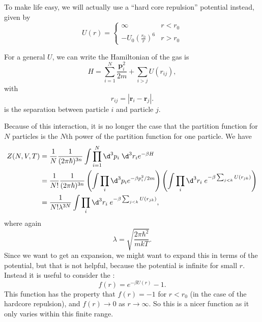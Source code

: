 \documentclass[a4paper]{article}
\begin{document}
\begin{eg}
\begin{center}
\begin{tikzpicture}
    \end{tikzpicture}
  \end{center}
  To make life easy, we will actually use a ``hard core repulsion'' potential instead, given by
  \[
    U(r) =
    \begin{cases}
      \infty & r < r_0\\
      -U_0 \left(\frac{r_0}{r}\right)^6 & r > r_0
    \end{cases}
  \]
  \begin{center}
  \end{center}
\end{eg}
For a general $U$, we can write the Hamiltonian of the gas is
\[
  H = \sum_{i = 1}^N \frac{\mathbf{p}_i^2}{2m} + \sum_{i > j} U(r_{ij}),
\]
with
\[
  r_{ij} = |\mathbf{r}_i - \mathbf{r}_j|.
\]
is the separation between particle $i$ and particle $j$.

Because of this interaction, it is no longer the case that the partition function for $N$ particles is the $N$th power of the partition function for one particle. We have
\begin{align*}
  Z(N, V, T) &= \frac{1}{N} \frac{1}{(2\pi \hbar)^{3n}} \int \prod_{i = 1}^N \d^3 p_i\; \d^3 r_i e^{-\beta H}\\
  &= \frac{1}{N!} \frac{1}{(2\pi \hbar)^{3n}} \left(\int \prod_{i} \d^3 p_i e^{-\beta p_i^2/2m}\right)\left(\int \prod_i \d^3 r_i\; e^{-\beta \sum_{j < k} U(r_{jk})} \right)\\
  &= \frac{1}{N! \lambda^{3N}} \int \prod_i \d^3 r_i\; e^{-\beta \sum_{j < k} U(r_{jk})},
\end{align*}
where again
\[
  \lambda = \sqrt{\frac{2\pi \hbar^2}{mkT}}.
\]
Since we want to get an expansion, we might want to expand this in terms of the potential, but that is not helpful, because the potential is infinite for small $r$. Instead it is useful to consider the :
\[
  f(r) = e^{-\beta U(r)} - 1.
\]
This function has the property that $f(r) = -1$ for $r < r_0$ (in the case of the hardcore repulsion), and $f(r) \to 0$ as $r \to \infty$. So this is a nicer function as it only varies within this finite range.
\end{document}
